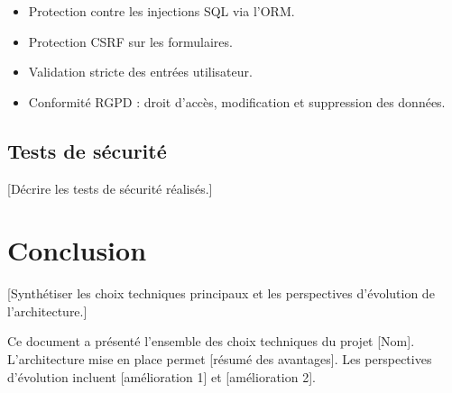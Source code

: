 \documentclass[12pt, a4paper]{article}
\begin{document}
\begin{itemize}
  \item Protection contre les injections SQL via l'ORM.
  \item Protection CSRF sur les formulaires.
  \item Validation stricte des entrées utilisateur.
  \item Conformité RGPD : droit d'accès, modification et suppression des données.
\end{itemize}

\subsection{Tests de sécurité}

[Décrire les tests de sécurité réalisés.]

\section{Conclusion}

[Synthétiser les choix techniques principaux et les perspectives d'évolution
de l'architecture.]

Ce document a présenté l'ensemble des choix techniques du projet [Nom].
L'architecture mise en place permet [résumé des avantages]. Les perspectives
d'évolution incluent [amélioration 1] et [amélioration 2].
\end{document}
